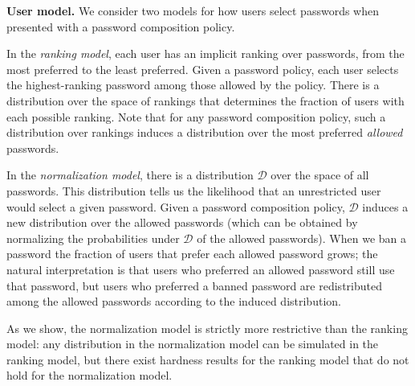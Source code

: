 \documentclass[prodmode,acmec]{ec-acmsmall}
\begin{document}
{\smallskip
\noindent\textbf{User model.} 
We consider two models for how users select passwords when presented with a password composition policy. 

In the \emph{ranking model}, each user has an implicit ranking over passwords, from the most preferred to the least preferred. Given a password policy, each user selects the highest-ranking password among those allowed by the policy. There is a distribution over the space of rankings that determines the fraction of users with each possible ranking. Note that for any password composition policy, such a distribution over rankings induces a distribution over the most preferred \emph{allowed} passwords. 

In the \emph{normalization model}, there is a distribution $\mathcal{D}$ over the space of all passwords. This distribution tells us the likelihood that an unrestricted user would select a given password. Given a password composition policy, $\mathcal{D}$ induces a new distribution over the allowed passwords (which can be obtained by normalizing the probabilities under $\mathcal{D}$ of the allowed passwords). When we ban a password the fraction of users that prefer each allowed password grows; the natural interpretation is that users who preferred an allowed password still use that password, but users who preferred a banned password are redistributed among the allowed passwords according to the induced distribution. 
 
As we show, the normalization model is strictly more restrictive than the ranking model: any distribution in the normalization model can be simulated in the ranking model, but there exist hardness results for the ranking model that do not hold for the normalization model.





}
\end{document}
